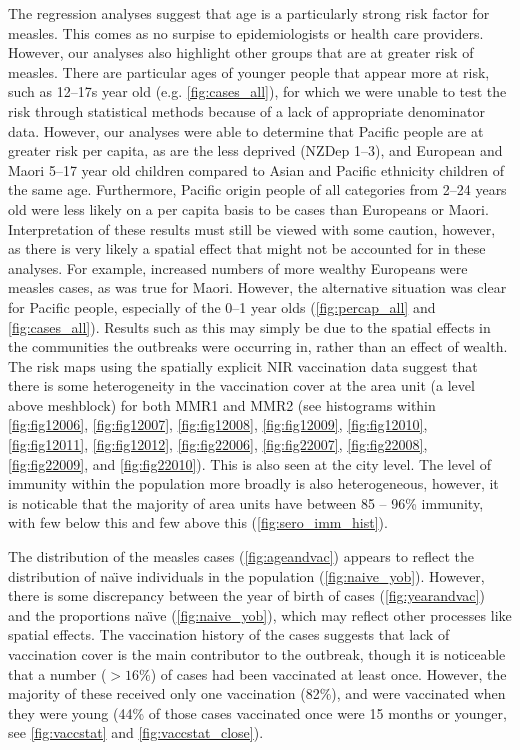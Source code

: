 \documentclass{article}
\begin{document}
The regression analyses suggest that age is a particularly strong risk factor for measles. This comes as no surpise to epidemiologists or health care providers. However, our analyses also highlight other groups that are at greater risk of measles. There are particular ages of younger people that appear more at risk, such as 12--17s year old (e.g. \autoref{fig:cases_all}), for which we were unable to test the risk through statistical methods because of a lack of appropriate denominator data. However, our analyses were able to determine that Pacific people are at greater risk per capita, as are the less deprived (NZDep 1--3), and European and Maori 5--17 year old children compared to Asian and Pacific ethnicity children of the same age. Furthermore, Pacific origin people of all categories from 2--24 years old were less likely on a per capita basis to be cases than Europeans or Maori. Interpretation of these results must still be viewed with some caution, however, as there is very likely a spatial effect that might not be accounted for in these analyses. For example, increased numbers of more wealthy Europeans were measles cases, as was true for Maori. However, the alternative situation was clear for Pacific people, especially of the 0--1 year olds (\autoref{fig:percap_all} and \autoref{fig:cases_all}). Results such as this may simply be due to the spatial effects in the communities the outbreaks were occurring in, rather than an effect of wealth. The risk maps using the spatially explicit NIR vaccination data suggest that there is some heterogeneity in the vaccination cover at the area unit (a level above meshblock) for both MMR1 and MMR2 (see histograms within \autoref{fig:fig12006}, \autoref{fig:fig12007}, \autoref{fig:fig12008}, \autoref{fig:fig12009}, \autoref{fig:fig12010}, \autoref{fig:fig12011}, \autoref{fig:fig12012}, \autoref{fig:fig22006}, \autoref{fig:fig22007}, \autoref{fig:fig22008}, \autoref{fig:fig22009}, and \autoref{fig:fig22010}). This is also seen at the city level. The level of immunity within the population more broadly is also heterogeneous, however, it is noticable that the majority of area units have between 85 -- 96\% immunity, with few below this and few above this (\autoref{fig:sero_imm_hist}).

The distribution of the measles cases (\autoref{fig:ageandvac}) appears to reflect the distribution of na\"{\i}ve individuals in the population (\autoref{fig:naive_yob}). However, there is some discrepancy between the year of birth of cases (\autoref{fig:yearandvac}) and the proportions na\"{\i}ve (\autoref{fig:naive_yob}), which may reflect other processes like spatial effects. The vaccination history of the cases suggests that lack of vaccination cover is the main contributor to the outbreak, though it is noticeable that a number ($>16\%$) of cases had been vaccinated at least once. However, the majority of these received only one vaccination (82\%), and were vaccinated when they were young (44\% of those cases vaccinated once were 15 months or younger, see \autoref{fig:vaccstat} and \autoref{fig:vaccstat_close}).
\end{document}

